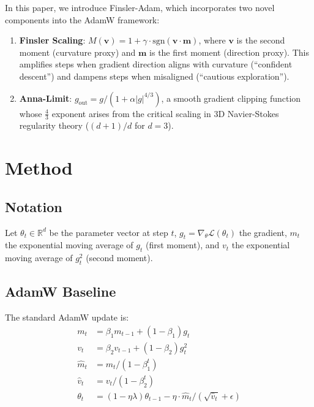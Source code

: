 \documentclass[11pt,a4paper,twocolumn]{article}
\begin{document}
In this paper, we introduce Finsler-Adam, which incorporates two novel components into the AdamW framework:

\begin{enumerate}
  \item \textbf{Finsler Scaling}: $M(\mathbf{v}) = 1 + \gamma \cdot \text{sgn}(\mathbf{v} \cdot \mathbf{m})$, where $\mathbf{v}$ is the second moment (curvature proxy) and $\mathbf{m}$ is the first moment (direction proxy). This amplifies steps when gradient direction aligns with curvature (``confident descent'') and dampens steps when misaligned (``cautious exploration'').

  \item \textbf{Anna-Limit}: $g_{\text{out}} = g / (1 + \alpha |g|^{4/3})$, a smooth gradient clipping function whose $\frac{4}{3}$ exponent arises from the critical scaling in 3D Navier-Stokes regularity theory ($(d+1)/d$ for $d=3$).
\end{enumerate}

\section{Method}

\subsection{Notation}

Let $\theta_t \in \mathbb{R}^d$ be the parameter vector at step $t$, $g_t = \nabla_\theta \mathcal{L}(\theta_t)$ the gradient, $m_t$ the exponential moving average of $g_t$ (first moment), and $v_t$ the exponential moving average of $g_t^2$ (second moment).

\subsection{AdamW Baseline}

The standard AdamW update is:
\begin{align}
  m_t &= \beta_1 m_{t-1} + (1-\beta_1) g_t \\
  v_t &= \beta_2 v_{t-1} + (1-\beta_2) g_t^2 \\
  \hat{m}_t &= m_t / (1-\beta_1^t) \\
  \hat{v}_t &= v_t / (1-\beta_2^t) \\
  \theta_t &= (1 - \eta\lambda)\theta_{t-1} - \eta \cdot \hat{m}_t / (\sqrt{\hat{v}_t} + \epsilon)
\end{align}
\end{document}
